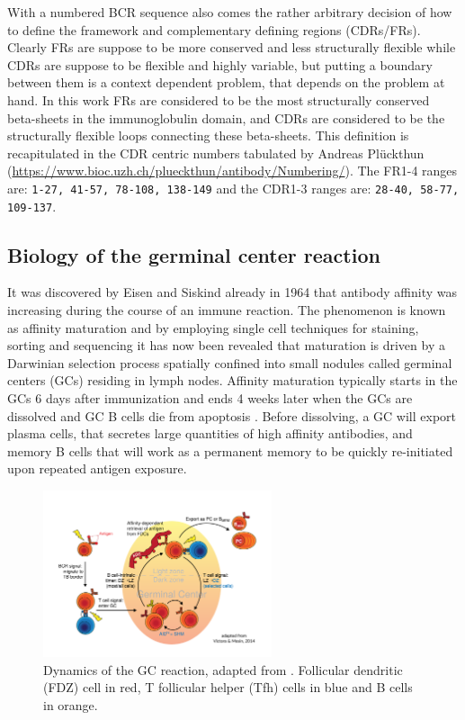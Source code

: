 With a numbered BCR sequence also comes the rather arbitrary decision of how to define the framework and complementary defining regions (CDRs/FRs).
Clearly FRs are suppose to be more conserved and less structurally flexible while CDRs are suppose to be flexible and highly variable, but putting a boundary between them is a context dependent problem, that depends on the problem at hand.
In this work FRs are considered to be the most structurally conserved beta-sheets in the immunoglobulin domain, and CDRs are considered to be the structurally flexible loops connecting these beta-sheets.
This definition is recapitulated in the CDR centric numbers tabulated by Andreas Pl{\"u}ckthun (\url{https://www.bioc.uzh.ch/plueckthun/antibody/Numbering/}).
The FR1-4 ranges are: \texttt{1-27, 41-57, 78-108, 138-149} and the CDR1-3 ranges are: \texttt{28-40, 58-77, 109-137}.






\subsection{Biology of the germinal center reaction}
It was discovered by Eisen and Siskind already in 1964 \cite{eisen1964variations} that antibody affinity was increasing during the course of an immune reaction.
The phenomenon is known as affinity maturation and by employing single cell techniques for staining, sorting and sequencing it has now been revealed that maturation is driven by a Darwinian selection process spatially confined into small nodules called germinal centers (GCs) residing in lymph nodes.
Affinity maturation typically starts in the GCs 6 days after immunization and ends 4 weeks later when the GCs are dissolved and GC B cells die from apoptosis \cite{victora2012germinal}.
Before dissolving, a GC will export plasma cells, that secretes large quantities of high affinity antibodies, and memory B cells that will work as a permanent memory to be quickly re-initiated upon repeated antigen exposure.

\begin{figure}[!ht]
    \centering
    \includegraphics[width=0.6\textwidth]{figures/GC_reaction.pdf}
    \caption{
        \label{fig:GC_reaction}
        Dynamics of the GC reaction, adapted from \cite{victora2014clonal}.
        Follicular dendritic (FDZ) cell in red, T follicular helper (Tfh) cells in blue and B cells in orange.
    }
\end{figure}



